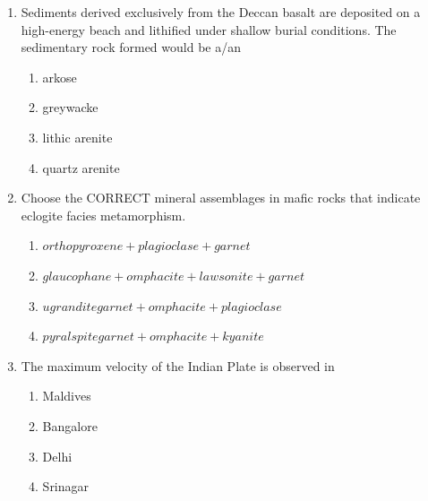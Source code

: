 \documentclass[journal,12pt,onecolumn]{IEEEtran}
\theoremstyle{remark}
\begin{document}
\begin{enumerate}
\item Sediments derived exclusively from the Deccan basalt are deposited on a high-energy beach and lithified under shallow burial conditions. The sedimentary rock formed would be a/an  
\begin{enumerate}
\item arkose  
\item greywacke  
\item lithic arenite  
\item quartz arenite  
\end{enumerate}

\item Choose the CORRECT mineral assemblages in mafic rocks that indicate eclogite facies metamorphism.  
\begin{enumerate}
\item $orthopyroxene + plagioclase + garnet  $
\item $glaucophane + omphacite + lawsonite + garnet $ 
\item $ugrandite garnet + omphacite + plagioclase  $
\item $pyralspite garnet + omphacite + kyanite  $
\end{enumerate}

\item The maximum velocity of the Indian Plate is observed in  
\begin{multicols}{4}
\begin{enumerate}
\item Maldives  
\item Bangalore  
\item Delhi  
\item Srinagar  
\end{enumerate}
\end{multicols}

\end{enumerate}
\newpage
\end{document}

